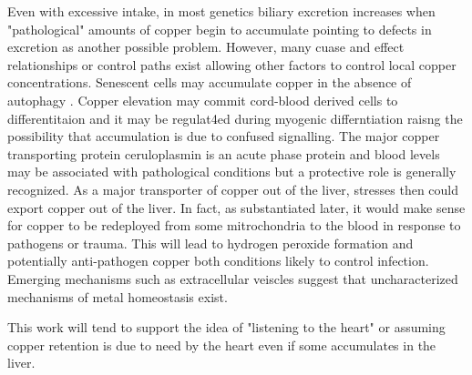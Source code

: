 {Even with excessive intake, in most genetics
 biliary excretion increases when "pathological"
amounts of copper begin to accumulate
\cite{Chen_Min_Wang_Copper_homeostasis_cuproptosis_2022}
\cite{Hamza_Gitlin_Hepatic_Copper_Transport_2013} pointing
to defects in excretion as another possible problem.
However, many cuase and effect relationships or
control paths exist allowing other factors to control
local copper concentrations.  
Senescent cells may accumulate copper in the absence
of autophagy
\cite{Masaldan_Clatworthy_Gamell_Copper_accumulation_senescent_2018}.
Copper elevation may commit 
cord-blood derived cells  to differentitaion \cite{PMID11849228}
and it may be regulat4ed during myogenic differntiation
\cite{PMC5824686} raisng the possibility that accumulation
is due to confused signalling. 
The major copper transporting protein ceruloplasmin is an 
acute phase protein 
and blood levels may be associated with pathological conditions
\cite{PMID15668644} but a protective role is generally recognized.
As a major transporter of copper out of the liver, 
stresses then could export copper  out of the  liver.
In fact, as substantiated later, it would make sense
for copper to be redeployed from some mitrochondria to the blood
in response to pathogens or trauma. This will lead to hydrogen
peroxide formation and potentially anti-pathogen copper both conditions
likely to control infection. 
Emerging mechanisms such as extracellular veiscles 
\cite{Bellingham_Guo_Hill_secret_life_2015} suggest
that uncharacterized mechanisms of metal homeostasis
exist.

This work will tend to support the idea of "listening to the heart"
or assuming copper retention is due to need by the heart 
even if some accumulates in the liver. 


} %




